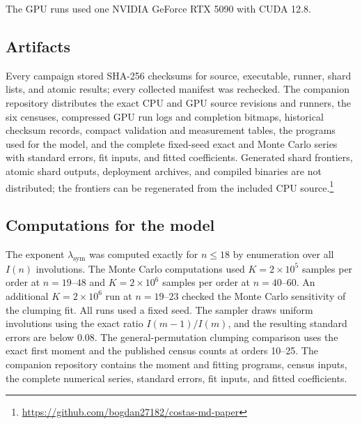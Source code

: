 \documentclass[11pt]{article}
\begin{document}
The GPU runs used one NVIDIA GeForce RTX 5090 with CUDA 12.8.

\subsection{Artifacts}
\label{app:artifacts}

Every campaign stored SHA-256 checksums for source, executable, runner,
shard lists, and atomic results; every collected manifest was rechecked.
The companion repository distributes the exact CPU and GPU source
revisions and runners, the six censuses, compressed GPU run logs and
completion bitmaps, historical checksum records, compact validation and
measurement tables, the programs used for the model, and the complete
fixed-seed exact and Monte Carlo series with standard errors, fit inputs,
and fitted coefficients.  Generated shard
frontiers, atomic shard outputs, deployment archives, and compiled binaries
are not distributed; the frontiers can be regenerated from the included
CPU source.\footnote{\url{https://github.com/bogdan27182/costas-md-paper}}

\subsection{Computations for the model}
\label{app:model-computation}

The exponent $\lambda_{\mathrm{sym}}$ was computed exactly for
$n\leq 18$ by enumeration over all $I(n)$ involutions.  The Monte Carlo
computations used $K=2\times 10^{5}$ samples per order at $n=19$--$48$ and
$K=2\times 10^{6}$ samples per order at $n=40$--$60$.  An additional
$K=2\times10^6$ run at $n=19$--$23$ checked the Monte Carlo sensitivity of
the clumping fit.  All runs used a fixed seed.  The sampler draws uniform
involutions using the
exact ratio $I(m-1)/I(m)$, and the resulting standard errors are below
$0.08$.  The general-permutation clumping comparison uses the exact first
moment and the published census counts at orders 10--25.  The companion
repository contains the moment and fitting programs, census inputs, the
complete numerical series, standard errors, fit inputs, and fitted
coefficients.
\end{document}
